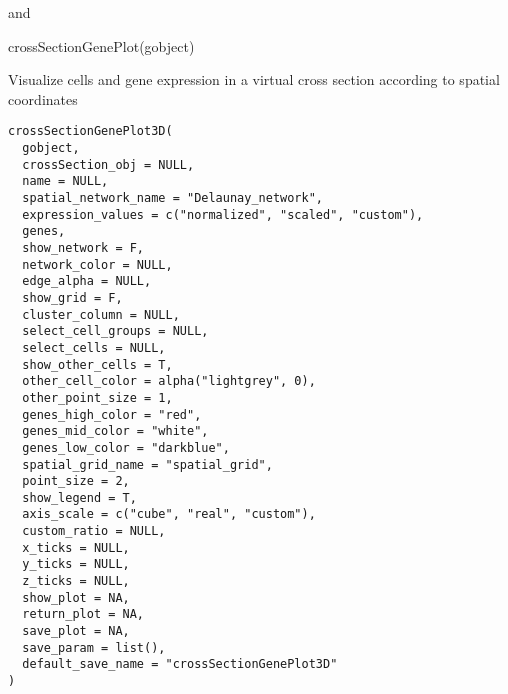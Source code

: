 \documentclass[a4paper]{book}
\begin{document}
%
\begin{SeeAlso}\relax
{} and 
\end{SeeAlso}
%
\begin{Examples}
\begin{ExampleCode}
    crossSectionGenePlot(gobject)

\end{ExampleCode}
\end{Examples}
%
\begin{Description}\relax
Visualize cells and gene expression in a virtual cross section according to spatial coordinates
\end{Description}
%
\begin{Usage}
\begin{verbatim}
crossSectionGenePlot3D(
  gobject,
  crossSection_obj = NULL,
  name = NULL,
  spatial_network_name = "Delaunay_network",
  expression_values = c("normalized", "scaled", "custom"),
  genes,
  show_network = F,
  network_color = NULL,
  edge_alpha = NULL,
  show_grid = F,
  cluster_column = NULL,
  select_cell_groups = NULL,
  select_cells = NULL,
  show_other_cells = T,
  other_cell_color = alpha("lightgrey", 0),
  other_point_size = 1,
  genes_high_color = "red",
  genes_mid_color = "white",
  genes_low_color = "darkblue",
  spatial_grid_name = "spatial_grid",
  point_size = 2,
  show_legend = T,
  axis_scale = c("cube", "real", "custom"),
  custom_ratio = NULL,
  x_ticks = NULL,
  y_ticks = NULL,
  z_ticks = NULL,
  show_plot = NA,
  return_plot = NA,
  save_plot = NA,
  save_param = list(),
  default_save_name = "crossSectionGenePlot3D"
)
\end{verbatim}
\end{Usage}
%
\end{document}

